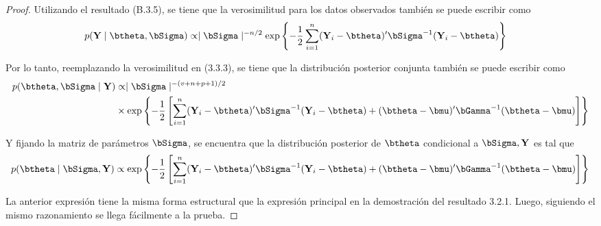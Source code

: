 \begin{proof}
Utilizando el resultado (B.3.5), se tiene que la verosimilitud para los datos observados también se puede escribir como
\begin{align*}
p(\mathbf{Y} \mid \btheta,\bSigma)
&\propto \mid \bSigma \mid ^{-n/2}\exp\left\{-\frac{1}{2}\sum_{i=1}^n(\mathbf{Y}_i-\btheta)'\bSigma^{-1}(\mathbf{Y}_i-\btheta)\right\}
\end{align*}

Por lo tanto, reemplazando la verosimilitud en (3.3.3), se tiene que la distribución posterior conjunta también se puede escribir como
\begin{align*}
p(\btheta,\bSigma \mid \mathbf{Y})
&\propto \mid \bSigma \mid ^{-(v+n+p+1)/2}\notag\\
&\times
\exp\left\{ -\frac{1}{2}\left[\sum_{i=1}^n(\mathbf{Y}_i-\btheta)'\bSigma^{-1}(\mathbf{Y}_i-\btheta)+(\btheta-\bmu)'\bGamma^{-1}(\btheta-\bmu)\right]\right\}
\end{align*}

Y fijando la matriz de parámetros $\bSigma$, se encuentra que la distribución posterior de $\btheta$ condicional a $\bSigma,\mathbf{Y}$ es tal que
\begin{align*}
p(\btheta \mid \bSigma,\mathbf{Y})
\propto
\exp\left\{ -\frac{1}{2}\left[\sum_{i=1}^n
                               (\mathbf{Y}_i-\btheta)'\bSigma^{-1}(\mathbf{Y}_i-\btheta)
                               +(\btheta-\bmu)'\bGamma^{-1}(\btheta-\bmu)\right]\right\}
\end{align*}

La anterior expresión tiene la misma forma estructural que la expresión principal en la demostración del resultado 3.2.1. Luego, siguiendo el mismo razonamiento se llega fácilmente a la prueba.
\end{proof}

